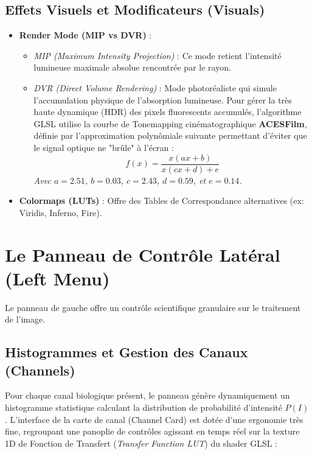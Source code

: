 \subsection{Effets Visuels et Modificateurs (Visuals)}

\begin{itemize}
    \item \textbf{Render Mode (MIP vs DVR)} :
    \begin{itemize}
        \item \textit{MIP (Maximum Intensity Projection)} : Ce mode retient l'intensité lumineuse maximale absolue rencontrée par le rayon.
        \item \textit{DVR (Direct Volume Rendering)} : Mode photoréaliste qui simule l'accumulation physique de l'absorption lumineuse. Pour gérer la très haute dynamique (HDR) des pixels fluorescents accumulés, l'algorithme GLSL utilise la courbe de Tonemapping cinématographique \textbf{ACESFilm}, définie par l'approximation polynômiale suivante permettant d'éviter que le signal optique ne "brûle" à l'écran :
\begin{equation}
f(x) = \frac{x (a x + b)}{x (c x + d) + e}
\end{equation}
\textit{Avec $a=2.51$, $b=0.03$, $c=2.43$, $d=0.59$, et $e=0.14$.}
    \end{itemize}
    \item \textbf{Colormaps (LUTs)} : Offre des Tables de Correspondance alternatives (ex: Viridis, Inferno, Fire).
\end{itemize}

\section{Le Panneau de Contrôle Latéral (Left Menu)}

Le panneau de gauche offre un contrôle scientifique granulaire sur le traitement de l'image.

\subsection{Histogrammes et Gestion des Canaux (Channels)}
Pour chaque canal biologique présent, le panneau génère dynamiquement un histogramme statistique calculant la distribution de probabilité d'intensité $P(I)$.
L'interface de la carte de canal (Channel Card) est dotée d'une ergonomie très fine, regroupant une panoplie de contrôles agissant en temps réel sur la texture 1D de Fonction de Transfert (\textit{Transfer Function LUT}) du shader GLSL :

